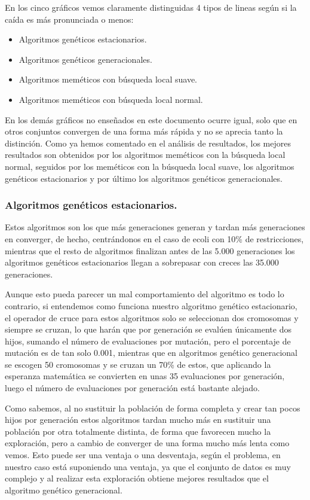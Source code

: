 \documentclass[12pt, spanish]{article}
\begin{document}
En los cinco gráficos vemos claramente distinguidas 4 tipos de lineas según si la caída es más pronunciada o menos:

\begin{itemize}
	\item Algoritmos genéticos estacionarios.
	\item Algoritmos genéticos generacionales.
	\item Algoritmos meméticos con búsqueda local suave.
	\item Algoritmos meméticos con búsqueda local normal.
\end{itemize}

En los demás gráficos no enseñados en este documento ocurre igual, solo que en otros conjuntos convergen de una forma más rápida y no se aprecia tanto la distinción. Como ya hemos comentado en el análisis de resultados, los mejores resultados son obtenidos por los algoritmos meméticos con la búsqueda local normal, seguidos por los meméticos con la búsqueda local suave, los algoritmos genéticos estacionarios y por último los algoritmos genéticos generacionales.

\newpage

\subsubsection{Algoritmos genéticos estacionarios.}

Estos algoritmos son los que más generaciones generan y tardan más generaciones en converger, de hecho, centrándonos en el caso de ecoli con 10\% de restricciones, mientras que el resto de algoritmos finalizan antes de las 5.000 generaciones los algoritmos genéticos estacionarios llegan a sobrepasar con creces las 35.000 generaciones.

Aunque esto pueda parecer un mal comportamiento del algoritmo es todo lo contrario, si entendemos como funciona nuestro algoritmo genético estacionario, el operador de cruce para estos algoritmos solo se seleccionan dos cromosomas y siempre se cruzan, lo que harán que por generación se evalúen únicamente dos hijos, sumando el número de evaluaciones por mutación, pero el porcentaje de mutación es de tan solo 0.001, mientras que en algoritmos genético generacional se escogen 50 cromosomas y se cruzan un 70\% de estos, que aplicando la esperanza matemática se convierten en unas 35 evaluaciones por generación, luego el número de evaluaciones por generación está bastante alejado.

Como sabemos, al no sustituir la población de forma completa y crear tan pocos hijos por generación estos algoritmos tardan mucho más en sustituir una población por otra totalmente distinta, de forma que favorecen mucho la exploración, pero a cambio de converger de una forma mucho más lenta como vemos. Esto puede ser una ventaja o una desventaja, según el problema, en nuestro caso está suponiendo una ventaja, ya que el conjunto de datos es muy complejo y al realizar esta exploración obtiene mejores resultados que el algoritmo genético generacional.
\end{document}
